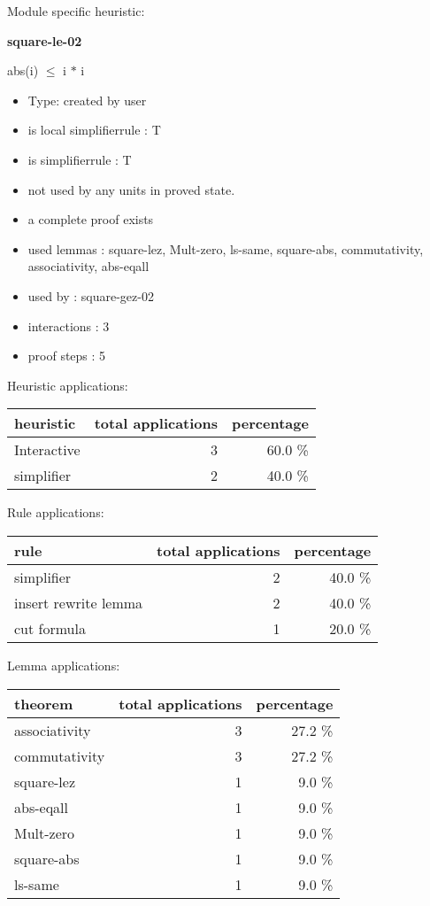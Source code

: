 \documentclass[a4paper]{article}
\begin{document}
Module specific heuristic:

\pagebreak

{\LARGE\bf square-le-02}\label{lemma-square-le-02}

\medskip

 \Fol abs(i) $\le$ i $*$ i

\begin{itemize}

\item Type: created by user

\item is local simplifierrule : T
\item is simplifierrule : T
\item not used by any units in proved state.
\item       a complete proof exists
\item       used lemmas  : square-lez, Mult-zero, ls-same, square-abs, commutativity, associativity, abs-eqall
\item       used by      : square-gez-02
\item       interactions : 3
\item       proof steps  : 5
\end{itemize}

\medskip


Heuristic applications:

\begin{supertabular}{l|r|r}
heuristic	& total applications & percentage \\ \hline
Interactive & 3 & 60.0 \% \\
simplifier & 2 & 40.0 \% \\

\end{supertabular}

Rule applications:

\begin{supertabular}{l|r|r}
rule	        & total applications & percentage \\ \hline
simplifier & 2 & 40.0 \% \\
insert rewrite lemma & 2 & 40.0 \% \\
cut formula & 1 & 20.0 \% \\

\end{supertabular}

Lemma applications:

\begin{supertabular}{l|r|r}
theorem	        & total applications & percentage \\ \hline
associativity & 3 & 27.2 \% \\
commutativity & 3 & 27.2 \% \\
square-lez & 1 & 9.0 \% \\
abs-eqall & 1 & 9.0 \% \\
Mult-zero & 1 & 9.0 \% \\
square-abs & 1 & 9.0 \% \\
ls-same & 1 & 9.0 \% \\

\end{supertabular}
\end{document}
